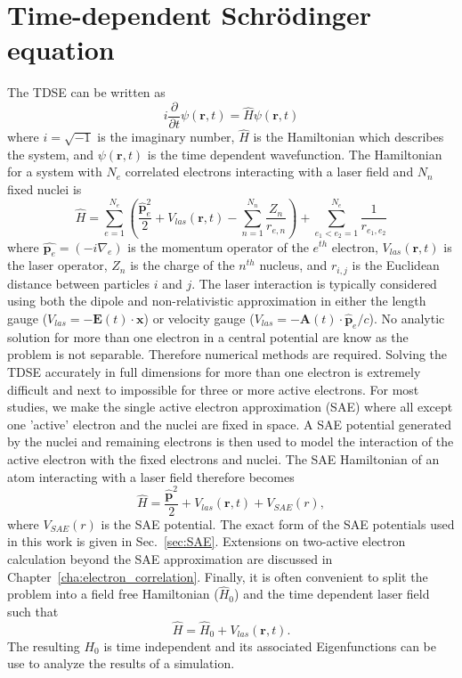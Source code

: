 \section{Time-dependent Schr\"odinger equation}
\label{sec:TDSE}
The TDSE can be written as
\begin{equation}
    i\frac{\partial}{\partial t}\psi(\mathbf{r},t) = \hat{H}\psi(\mathbf{r},t)
    \label{eq:TDSE}
\end{equation}
where $i=\sqrt{-1}$ is the imaginary number, $\hat{H}$ is the Hamiltonian which describes the system, and $\psi(\mathbf{r},t)$ is the time dependent wavefunction. The Hamiltonian for a system with $N_e$ correlated electrons interacting with a laser field and $N_n$ fixed nuclei is
\begin{equation}
    \label{eq:atoms_and_molecules}
    \hat{H} = \sum_{e=1}^{N_e}\left(\frac{\hat{\mathbf{p}}^2_e}{2} + V_{las}(\mathbf{r},t) - \sum_{n=1}^{N_n} \frac{Z_n}{r_{e,n}}\right) + \sum_{e_1 < e_2=1}^{N_e}\frac{1}{r_{e_1, e_2}}
\end{equation}
where $\hat{\mathbf{p}_e}=(-i\nabla_e)$ is the momentum operator of the $e^{th}$ electron, $V_{las}(\mathbf{r},t)$ is the laser operator, $Z_n$ is the charge of the $n^{th}$ nucleus, and $r_{i,j}$ is the Euclidean distance between particles $i$ and $j$. The laser interaction is typically considered using both the dipole and non-relativistic approximation in either the length gauge ($V_{las} = - \mathbf{E}(t)\cdot \mathbf{x}$) or velocity gauge ($V_{las} = - \mathbf{A}(t)\cdot \hat{\mathbf{p}}_e / c$). No analytic solution for more than one electron in a central potential are know as the problem is not separable. Therefore numerical methods are required. Solving the TDSE accurately in full dimensions for more than one electron is extremely difficult and next to impossible for three or more active electrons. For most studies, we make the single active electron approximation (SAE) where all except one 'active' electron and the nuclei are fixed in space. A SAE potential generated by the nuclei and remaining electrons is then used to model the interaction of the active electron with the fixed electrons and nuclei. The SAE Hamiltonian of an atom interacting with a laser field therefore becomes 
\begin{equation}
    \label{eq:SAE}
    \hat{H} = \frac{\hat{\mathbf{p}}^2}{2} + V_{las}(\mathbf{r},t) + V_{SAE}(r),
\end{equation}
where $V_{SAE}(r)$ is the SAE potential. The exact form of the SAE potentials used in this work is given in Sec.~\ref{sec:SAE}. Extensions on two-active electron calculation beyond the SAE approximation are discussed in Chapter~\ref{cha:electron_correlation}. Finally, it is often convenient to split the problem into a field free Hamiltonian ($\hat{H}_0$) and the time dependent laser field such that 
\begin{equation}
    \label{eq:field_free}
    \hat{H} = \hat{H}_0 + V_{las}(\mathbf{r},t).
\end{equation}
The resulting $H_0$ is time independent and its associated Eigenfunctions can be use to analyze the results of a simulation. 



